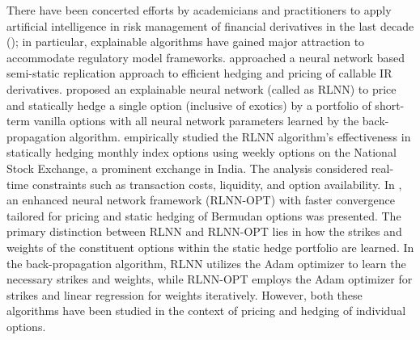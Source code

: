 \noindent There have been concerted efforts by academicians and practitioners to apply artificial intelligence in risk management of financial derivatives in the last decade (\cite{leo2019machine}); in particular, explainable algorithms have gained major attraction to accommodate regulatory model frameworks. \cite{hoencamp2022semi} approached a neural network based semi-static replication approach to efficient hedging and pricing of callable IR derivatives. \cite{lokeshwar2022explainable} proposed an explainable neural network (called as RLNN) to price and statically hedge a single option (inclusive of exotics) by a portfolio of short-term vanilla options with all neural network parameters learned by the back-propagation algorithm. \cite{dhandapani2023data} empirically studied the RLNN algorithm's effectiveness in statically hedging monthly index options using weekly options on the National Stock Exchange, a prominent exchange in India. The analysis considered real-time constraints such as transaction costs, liquidity, and option availability. In \cite{dhandapani2024bermudan}, an enhanced neural network framework (RLNN-OPT) with faster convergence tailored for pricing and static hedging of Bermudan options was presented. The primary distinction between RLNN and RLNN-OPT lies in how the strikes and weights of the constituent options within the static hedge portfolio are learned. In the back-propagation algorithm, RLNN utilizes the Adam optimizer to learn the necessary strikes and weights, while RLNN-OPT employs the Adam optimizer for strikes and linear regression for weights iteratively. However, both these algorithms have been studied in the context of pricing and hedging of individual options.  \\ 


